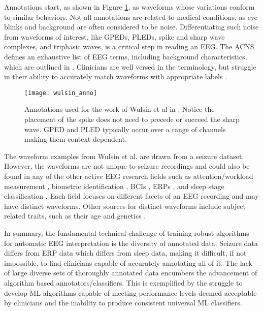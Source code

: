 Annotations start, as shown in Figure \ref{fig:wulsin_anno}, as waveforms whose variations conform to similar behaviors. Not all annotations are related to medical conditions, as eye blinks and background are often considered to be noise. Differentiating such noise from waveforms of interest, like \acp{GPED}, \acp{PLED}, spike and sharp wave complexes, and triphasic waves, is a critical step in reading an \ac{EEG}. The \ac{ACNS} defines an exhaustive list of \ac{EEG} terms, including background characteristics, which are outlined in \cite{Westhall2015}. Clinicians are well versed in the terminology, but struggle in their ability to accurately match waveforms with appropriate labels \cite{Gerber2008}.

\begin{figure}
\centering
\texttt{[image: wulsin\_anno]}
\caption[Annotation example]{Annotations used for the work of Wulsin et al in \cite{Wulsin2011}. Notice the placement of the spike does not need to precede or succeed the sharp wave. \ac{GPED} and \ac{PLED} typically occur over a range of channels making them context dependent.}
\label{fig:wulsin_anno}
\end{figure}

The waveform examples from Wulsin et al. \cite{Wulsin2011} are drawn from a seizure dataset. However, the waveforms are not unique to seizure recordings and could also be found in any of the other active \ac{EEG} research fields such as attention/workload measurement \cite{Wang2012}, biometric identification \cite{Rocca2012}, \acp{BCI} \cite{Lance2012}, \acp{ERP} \cite{Makeig2012}, and sleep stage classification \cite{Schluter2012}. Each field focuses on different facets of an \ac{EEG} recording and may have distinct waveforms. Other sources for distinct waveforms include subject related traits, such as their age \cite{Warby2014,Clarke2001} and genetics \cite{Begleiter2006}.

In summary, the fundamental technical challenge of training robust algorithms for automatic \ac{EEG} interpretation is the diversity of annotated data. Seizure data differs from \ac{ERP} data which differs from sleep data, making it difficult, if not impossible, to find clinicians capable of accurately annotating all of it. The lack of large diverse sets of thoroughly annotated data encumbers the advancement of algorithm based annotators/classifiers. This is exemplified by the struggle to develop \ac{ML} algorithms capable of meeting performance levels deemed acceptable by clinicians and the inability to produce consistent universal \ac{ML} classifiers.

